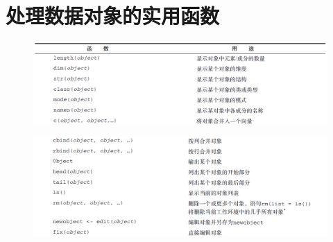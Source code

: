 \documentclass[11pt,a4paper,oneside]{book}
\begin{document}
\section{处理数据对象的实用函数}
\begin{figure}[H]
	\centering
	\includegraphics[width=\textwidth]{screenshot006}
\end{figure}
\begin{figure}[H]
	\centering
	\includegraphics[width=\textwidth]{screenshot007}
\end{figure}

\begin{lstlisting}[language=R]
	
\end{lstlisting}

\begin{lstlisting}[language=R]
	
\end{lstlisting}

\begin{lstlisting}[language=R]
	
\end{lstlisting}

\begin{lstlisting}[language=R]
	
\end{lstlisting}

\begin{lstlisting}[language=R]
	
\end{lstlisting}

\begin{lstlisting}[language=R]
	
\end{lstlisting}
\end{document}
